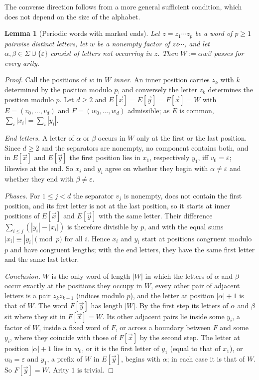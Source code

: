 \documentclass[11pt]{article}
\numberwithin{equation}{section}
\theoremstyle{plain}
\newtheorem{lemma}[theorem]{Lemma}
\theoremstyle{definition}
\theoremstyle{remark}
\newcommand{\tuple}[1]{\vec{#1}}
\newcommand{\eps}{\varepsilon}
\theoremstyle{plain}
\begin{document}
The converse direction follows from a more general sufficient condition,
which does not depend on the size of the alphabet.

\begin{lemma}[Periodic words with marked ends]
\label{lem:app-singleton-periodic}
Let $z=z_1\cdots z_p$ be a word of $p\ge1$ pairwise distinct letters, let $w$ be a
nonempty factor of $zz\cdots$, and let $\alpha,\beta\in\Sigma\cup\{\eps\}$ consist of
letters not occurring in $z$.  Then $W:=\alpha w\beta$ passes for every arity.
\end{lemma}

\begin{proof}
Call the positions of $w$ in $W$ \emph{inner}.  An inner position carries $z_k$
with $k$ determined by the position modulo $p$, and conversely the letter $z_k$
determines the position modulo $p$.  Let $d\ge2$ and
$E[\tuple x]=E[\tuple y]=F[\tuple x]=W$ with $E=(v_0,\ldots,v_d)$ and
$F=(w_0,\ldots,w_d)$ admissible; as $E$ is common,
$\sum_i|x_i|=\sum_i|y_i|$.

\emph{End letters.}  A letter of $\alpha$ or $\beta$ occurs in $W$ only at the
first or the last position.  Since $d\ge2$ and the separators are nonempty, no
component contains both, and in $E[\tuple x]$ and $E[\tuple y]$ the first
position lies in $x_1$, respectively $y_1$, iff $v_0=\eps$; likewise at the end.
So $x_i$ and $y_i$ agree on whether they begin with $\alpha\ne\eps$ and whether
they end with $\beta\ne\eps$.

\emph{Phases.}  For $1\le j<d$ the separator $v_j$ is nonempty, does not
contain the first position, and its first letter is not at the last position, so
it starts at inner positions of $E[\tuple x]$ and $E[\tuple y]$ with the same
letter.  Their difference $\sum_{i\le j}(|y_i|-|x_i|)$ is therefore divisible by
$p$, and with the equal sums $|x_i|\equiv|y_i|\pmod p$ for all $i$.  Hence $x_i$
and $y_i$ start at positions congruent modulo $p$ and have congruent lengths; with
the end letters, they have the same first letter and the same last letter.

\emph{Conclusion.}  $W$ is the only word of length $|W|$ in which the letters of
$\alpha$ and $\beta$ occur exactly at the positions they occupy in $W$, every
other pair of adjacent letters is a pair $z_kz_{k+1}$ (indices modulo $p$), and
the letter at position $|\alpha|+1$ is that of $W$.  The word $F[\tuple y]$ has
length $|W|$.  By the first step its letters of $\alpha$ and $\beta$ sit where
they sit in $F[\tuple x]=W$.  Its other adjacent pairs lie inside some $y_i$, a
factor of $W$, inside a fixed word of $F$, or across a boundary between $F$ and
some $y_i$, where they coincide with those of $F[\tuple x]$ by the second step.
The letter at position $|\alpha|+1$ lies in $w_0$, or it is the first letter of
$y_1$ (equal to that of $x_1$), or $w_0=\eps$ and $y_1$, a prefix of $W$ in
$E[\tuple y]$, begins with $\alpha$; in each case it is that of $W$.  So
$F[\tuple y]=W$.  Arity $1$ is trivial.
\end{proof}
\end{document}
